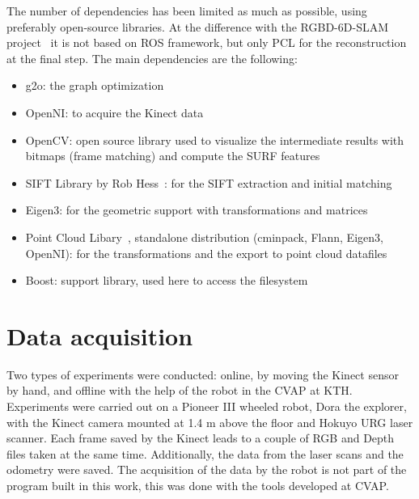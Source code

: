 The number of dependencies has been limited as much as possible, using preferably open-source libraries. At the difference with the RGBD-6D-SLAM project~\cite{engelhard11euron-workshop} it is not based on \gls{ROS} framework, but only \gls{PCL} for the reconstruction at the final step. The main dependencies are the following:
\begin{itemize}
\item g2o: the graph optimization
\item OpenNI: to acquire the Kinect data
\item OpenCV: open source library used to visualize the intermediate results with bitmaps (frame matching) and compute the \gls {SURF} features
\item SIFT Library by Rob Hess~\cite{hess_sift}: for the \gls{SIFT} extraction and initial matching
\item Eigen3: for the geometric support with transformations and matrices
\item Point Cloud Libary~\cite{Rusu_ICRA2011_PCL}, standalone distribution (cminpack, Flann, Eigen3, OpenNI): for the transformations and the export to point cloud datafiles
\item Boost: support library, used here to access the filesystem
\end{itemize}


\section{Data acquisition}

Two types of experiments were conducted: online, by moving the Kinect sensor by hand, and offline with the help of the robot in the \gls{CVAP} at \gls{KTH}. Experiments were carried out on a Pioneer III wheeled robot, Dora the explorer, with the Kinect camera mounted at 1.4 m above the floor and Hokuyo URG laser scanner. Each frame saved by the Kinect leads to a couple of RGB and Depth files taken at the same time. Additionally, the data from the laser scans and the odometry were saved. The acquisition of the data by the robot is not part of the program built in this work, this was done with the tools developed at \gls{CVAP}.


